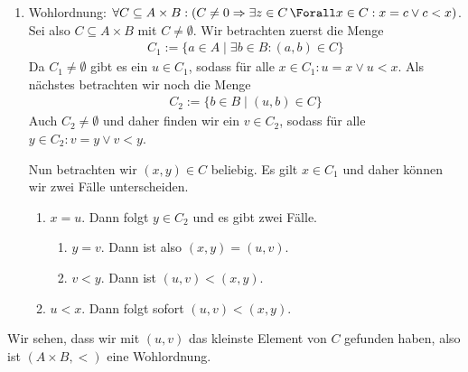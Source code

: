 \begin{solution}
\begin{enumerate}
		\item Wohlordnung: $\forall C \subseteq A \times B: (C \neq 0 \Rightarrow \exists z \in C\, \Forall x \in C: x = c \lor c < x)$. Sei also $C \subseteq A \times B$ mit $C \neq \emptyset$. Wir betrachten zuerst die Menge
			\begin{align*}
				C_1 := \{a \in A \mid \exists b \in B: (a,b) \in C\}
			\end{align*}
		Da $C_1 \neq \emptyset$ gibt es ein $u \in C_1$, sodass für alle $x \in C_1: u = x \lor u < x$. Als nächstes betrachten wir noch die Menge
			\begin{align*}
				C_2 := \{b \in B \mid (u, b) \in C\}
			\end{align*}
		Auch $C_2 \neq \emptyset$ und daher finden wir ein $v \in C_2$, sodass für alle $y \in C_2: v = y \lor v < y$.

		Nun betrachten wir $(x,y) \in C$ beliebig. Es gilt $x \in C_1$ und daher können wir zwei Fälle unterscheiden.
		\begin{enumerate}[label = Fall \arabic*:]
			\item $x = u$. Dann folgt $y \in C_2$ und es gibt zwei Fälle.
				\begin{enumerate}[label = Fall 1.\arabic*]
					\item $y = v$. Dann ist also $(x,y) = (u,v)$.
					\item $v < y$. Dann ist $(u,v) < (x,y)$.
				\end{enumerate}

			\item $u < x$. Dann folgt sofort $(u,v) < (x,y)$.
		\end{enumerate}
	\end{enumerate}

	Wir sehen, dass wir mit $(u,v)$ das kleinste Element von $C$ gefunden haben, also ist $(A \times B, <)$ eine Wohlordnung.

\end{solution}
